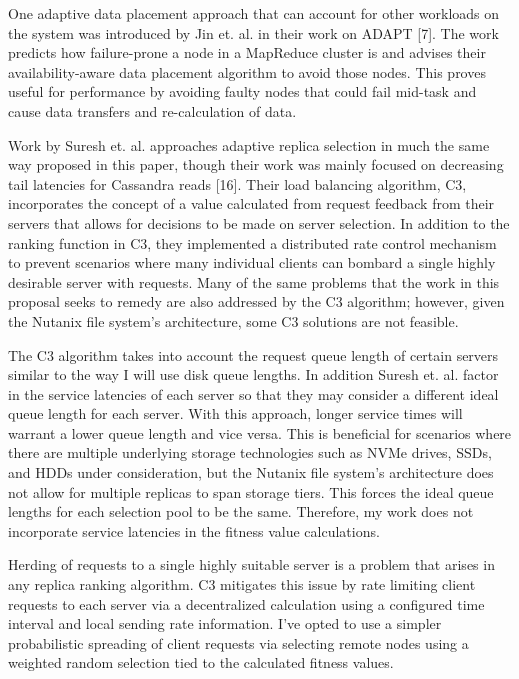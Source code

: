 \documentclass[12pt]{article}
\begin{document}
One adaptive data placement approach that can account for other workloads on
the system was introduced by Jin et. al. in their work on ADAPT [7]. The work
predicts how failure-prone a node in a MapReduce cluster is and advises their
availability-aware data placement algorithm to avoid those nodes. This proves
useful for performance by avoiding faulty nodes that could fail mid-task and
cause data transfers and re-calculation of data.

Work by Suresh et. al. approaches adaptive replica selection in much the same
way proposed in this paper, though their work was mainly focused on decreasing
tail latencies for Cassandra reads [16]. Their load balancing algorithm, C3,
incorporates the concept of a value calculated from request feedback from their
servers that allows for decisions to be made on server selection. In addition
to the ranking function in C3, they implemented a distributed rate control
mechanism to prevent scenarios where many individual clients can bombard a
single highly desirable server with requests. Many of the same problems that
the work in this proposal seeks to remedy are also addressed by the C3
algorithm; however, given the Nutanix file system's architecture, some C3
solutions are not feasible.

The C3 algorithm takes into account the request queue length of certain servers
similar to the way I will use disk queue lengths. In addition Suresh et. al.
factor in the service latencies of each server so that they may consider a
different ideal queue length for each server. With this approach, longer
service times will warrant a lower queue length and vice versa. This is
beneficial for scenarios where there are multiple underlying storage
technologies such as NVMe drives, SSDs, and HDDs under consideration, but the
Nutanix file system's architecture does not allow for multiple replicas to span
storage tiers. This forces the ideal queue lengths for each selection pool to
be the same. Therefore, my work does not incorporate service latencies in the
fitness value calculations.

Herding of requests to a single highly suitable server is a problem that arises
in any replica ranking algorithm. C3 mitigates this issue by rate limiting
client requests to each server via a decentralized calculation using a
configured time interval and local sending rate information. I've opted to use
a simpler probabilistic spreading of client requests via selecting remote nodes
using a weighted random selection tied to the calculated fitness values.
\end{document}
